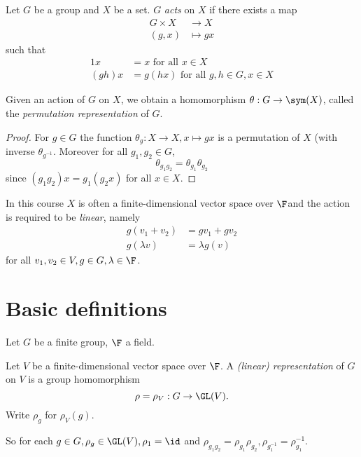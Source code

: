 \documentclass[a4paper]{article}
\begin{document}
\begin{definition}
  Let \(G\) be a group and \(X\) be a set. \(G\) \emph{acts} on \(X\) if there exists a map
  \begin{align*}
    G \times X &\to X \\
    (g, x) &\mapsto gx
  \end{align*}
  such that
  \begin{align*}
    1x &= x \text{ for all } x \in X \\
    (gh) x &= g (hx) \text{ for all } g, h \in G, x \in X
  \end{align*}
\end{definition}

\begin{proposition}
  Given an action of \(G\) on \(X\), we obtain a homomorphism \(\theta: G \to \sym(X)\), called the \emph{permutation representation} of \(G\).
\end{proposition}

\begin{proof}
  For \(g \in G\) the function \(\theta_g: X \to X, x \mapsto gx\) is a permutation of \(X\) (with inverse \(\theta_{g^{-1}}\). Moreover for all \(g_1, g_2 \in G\),
  \[
    \theta_{g_1 g_2} = \theta_{g_1} \theta_{g_2}
  \]
  since \((g_1g_2)x = g_1(g_2x)\) for all \(x \in X\).
\end{proof}

In this course \(X\) is often a finite-dimensional vector space over \(\F\)and the action is required to be \emph{linear}, namely
\begin{align*}
  g(v_1 + v_2) &= gv_1 + gv_2 \\
  g(\lambda v) &= \lambda g(v)
\end{align*}
for all \(v_1, v_2 \in V, g \in G, \lambda \in \F\).

\section{Basic definitions}

Let \(G\) be a finite group, \(\F\) a field.

\begin{definition}[representation]
  Let \(V\) be a finite-dimensional vector space over \(\F\). A \emph{(linear) representation} of \(G\) on \(V\) is a group homomorphism
  \[
    \rho = \rho_V: G \to \GL(V).
  \]
  Write \(\rho_g\) for \(\rho_V(g)\).
\end{definition}
So for each \(g \in G, \rho_g \in \GL(V), \rho_1 = \id\) and \(\rho_{g_1g_2} = \rho_{g_1}\rho_{g_2}, \rho_{g_1^{-1}} = \rho_{g_1}^{-1}\).
\end{document}
